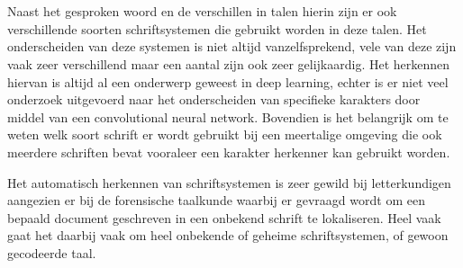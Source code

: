 
\chapter{}
\label{ch:inleiding}



Naast het gesproken woord en de verschillen in talen hierin zijn er ook verschillende soorten schriftsystemen die gebruikt worden in deze talen.
Het onderscheiden van deze systemen is niet altijd vanzelfsprekend, vele van deze zijn vaak zeer verschillend maar een aantal zijn ook zeer gelijkaardig.
Het herkennen hiervan is altijd al een onderwerp geweest in deep learning, echter is er niet veel onderzoek uitgevoerd naar het onderscheiden van specifieke karakters door middel van een convolutional neural network. 
Bovendien is het belangrijk om te weten welk soort schrift er wordt gebruikt bij een meertalige omgeving die ook meerdere schriften bevat vooraleer een karakter herkenner kan gebruikt worden.

Het automatisch herkennen van schriftsystemen is zeer gewild bij letterkundigen aangezien er bij de forensische taalkunde waarbij er gevraagd wordt om een bepaald document geschreven in een onbekend schrift te lokaliseren. Heel vaak gaat het daarbij vaak om heel onbekende of geheime schriftsystemen, of gewoon gecodeerde taal. 

